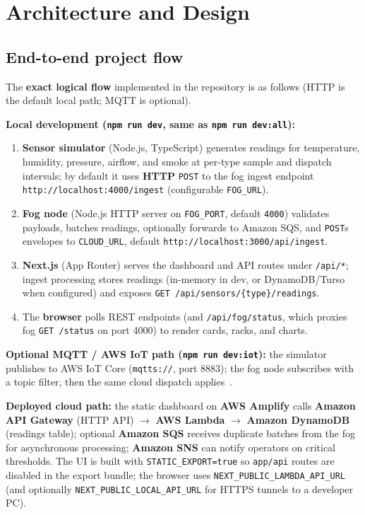 \documentclass[conference]{IEEEtran}
\begin{document}
\section{Architecture and Design}

\subsection{End-to-end project flow}
The \textbf{exact logical flow} implemented in the repository is as follows (HTTP is the default local path; MQTT is optional).

\textbf{Local development (\texttt{npm run dev}, same as \texttt{npm run dev:all}):}
\begin{enumerate}
  \item \textbf{Sensor simulator} (Node.js, TypeScript) generates readings for temperature, humidity, pressure, airflow, and smoke at per-type sample and dispatch intervals; by default it uses \textbf{HTTP} \texttt{POST} to the fog ingest endpoint \texttt{http://localhost:4000/ingest} (configurable \texttt{FOG\_URL}).
  \item \textbf{Fog node} (Node.js HTTP server on \texttt{FOG\_PORT}, default \texttt{4000}) validates payloads, batches readings, optionally forwards to Amazon SQS, and \texttt{POST}s envelopes to \texttt{CLOUD\_URL}, default \texttt{http://localhost:3000/api/ingest}.
  \item \textbf{Next.js} (App Router) serves the dashboard and API routes under \texttt{/api/*}; ingest processing stores readings (in-memory in dev, or DynamoDB/Turso when configured) and exposes \texttt{GET /api/sensors/\{type\}/readings}.
  \item The \textbf{browser} polls REST endpoints (and \texttt{/api/fog/status}, which proxies fog \texttt{GET /status} on port 4000) to render cards, racks, and charts.
\end{enumerate}

\textbf{Optional MQTT / AWS IoT path (\texttt{npm run dev:iot}):} the simulator publishes to AWS IoT Core (\texttt{mqtts://}, port 8883); the fog node subscribes with a topic filter, then the same cloud dispatch applies~\cite{mqtt2014,aws2024iot}.

\textbf{Deployed cloud path:} the static dashboard on \textbf{AWS Amplify} calls \textbf{Amazon API Gateway} (HTTP API) $\rightarrow$ \textbf{AWS Lambda} $\rightarrow$ \textbf{Amazon DynamoDB} (readings table); optional \textbf{Amazon SQS} receives duplicate batches from the fog for asynchronous processing; \textbf{Amazon SNS} can notify operators on critical thresholds. The UI is built with \texttt{STATIC\_EXPORT=true} so \texttt{app/api} routes are disabled in the export bundle; the browser uses \texttt{NEXT\_PUBLIC\_LAMBDA\_API\_URL} (and optionally \texttt{NEXT\_PUBLIC\_LOCAL\_API\_URL} for HTTPS tunnels to a developer PC).
\end{document}
